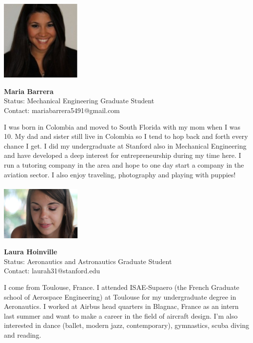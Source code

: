 \noindent \includegraphics[width=40mm]{images/image011.jpg}
\parbox[b]{0.6\textwidth}{\textbf{Maria Barrera}\\
Status: Mechanical Engineering Graduate Student\\
Contact: mariabarrera5491@gmail.com\\
}

I was born in Colombia and moved to South Florida with my mom when I was 10. My dad and sister still live in Colombia so I tend to hop back and forth every chance I get. I did my undergraduate at Stanford also in Mechanical Engineering and have developed a deep interest for entrepreneurship during my time here. I run a tutoring company in the area and hope to one day start a company in the aviation sector. I also enjoy traveling, photography and playing with puppies!
\\ \\


\noindent \includegraphics[width=40mm]{images/image012bis}
\parbox[b]{0.6\textwidth}{\textbf{Laura Hoinville}\\
Status: Aeronautics and Astronautics Graduate Student\\
Contact:  laurah31@stanford.edu \\
}

I come from Toulouse, France. I attended ISAE-Supaero (the French Graduate school of Aerospace Engineering) at Toulouse for my undergraduate degree in Aeronautics. I worked at Airbus head quarters in Blagnac, France as an intern last summer and want to make a career in the field of aircraft design. I'm also interested in dance (ballet, modern jazz, contemporary), gymnastics, scuba diving and reading.
\\ \\


